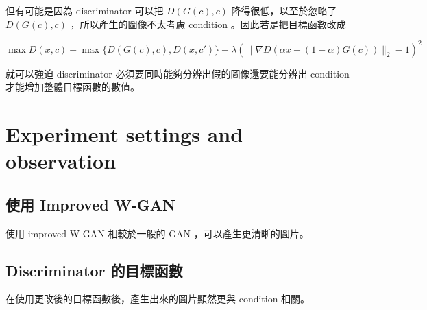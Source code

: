 \documentclass[fleqn,a4paper,12pt]{article}
\begin{document}
但有可能是因為 discriminator 可以把 $D(G(c), c)$ 降得很低，以至於忽略了 $D(G(c), c)$ ，所以產生的圖像不太考慮 condition 。因此若是把目標函數改成

\begin{equation*}
  \max D(x, c) -\max\{D(G(c), c), D(x, c')\} - \lambda (\lVert \nabla D(\alpha x + (1 - \alpha) G(c)) \rVert_2 - 1)^2
\end{equation*}

就可以強迫 discriminator 必須要同時能夠分辨出假的圖像還要能分辨出 condition 才能增加整體目標函數的數值。

\section{Experiment settings and observation}

\subsection{使用 Improved W-GAN}

使用 improved W-GAN 相較於一般的 GAN ，可以產生更清晰的圖片。

\subsection{Discriminator 的目標函數}

在使用更改後的目標函數後，產生出來的圖片顯然更與 condition 相關。
\end{document}
